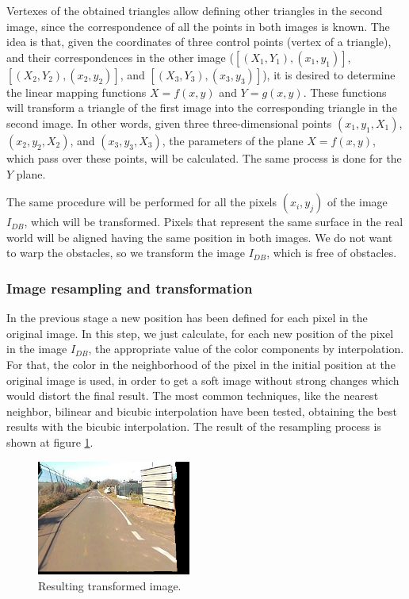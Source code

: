 Vertexes of the obtained triangles allow defining other triangles in the second image, since the correspondence of all the points in both images is known. The idea is that, given the coordinates of three control points (vertex of a triangle), and their correspondences in the other image ($[(X_1, Y_1), (x_1, y_1)]$, $[(X_2, Y_2), (x_2, y_2)]$, and $[(X_3, Y_3), (x_3, y_3)]$), it is desired to determine the linear mapping functions $X = f(x, y)$ and $Y = g(x, y)$. These functions will transform a triangle of the first image into the corresponding triangle in the second image. In other words, given three three-dimensional points $(x_1, y_1, X_1)$, $(x_2, y_2, X_2)$, and $(x_3, y_3, X_3)$, the parameters of the plane $X = f(x, y)$, which pass over these points, will be calculated. The same process is done for the $Y$ plane.

The same procedure will be performed for all the pixels $(x_i, y_j)$ of the image $I_{DB}$, which will be transformed. Pixels that represent the same surface in the real world will be aligned having the same position in both images. We do not want to warp the obstacles, so we transform the image $I_{DB}$, which is free of obstacles.

\subsubsection{Image resampling and transformation}\label{ch:chapter01_01_02_04}

In the previous stage a new position has been defined for each pixel in the original image. In this step, we just calculate, for each new position of the pixel in the image $I_{DB}$, the appropriate value of the color components by interpolation. For that, the color in the neighborhood of the pixel in the initial position at the original image is used, in order to get a soft image without strong changes which would distort the final result. The most common techniques, like the nearest neighbor, bilinear and bicubic interpolation have been tested, obtaining the best results with the bicubic interpolation. The result of the resampling process is shown at figure \ref{fig:cp01_transform_and_resample}.

\begin{figure}[h!]
\centering
\includegraphics[width=0.45\textwidth]{transformed}
\caption{Resulting transformed image.}\label{fig:cp01_transform_and_resample}
\end{figure}

